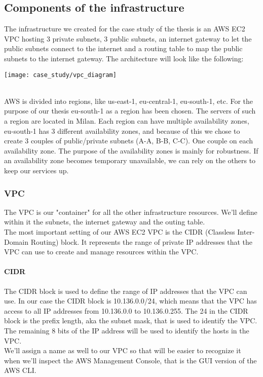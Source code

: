 \subsection{Components of the infrastructure}
The infrastructure we created for the case study of the thesis is an AWS EC2 \gls{VPC} hosting 3 private \gls{subnet}s, 3 public subnets, an \gls{internet gateway} to let the public subnets connect to the internet and a \gls{routing table} to map the public subnets to the internet gateway.
The architecture will look like the following:
\begin{center}
  \texttt{[image: case\_study/vpc\_diagram]} 
\end{center}\mbox{}\\
AWS is divided into regions, like us-east-1, eu-central-1, eu-south-1, etc.
For the purpose of our thesis eu-south-1 as a region has been chosen.
The servers of such a region are located in Milan.
Each region can have multiple availability zones, eu-south-1 has 3 different availability zones, and because of this we chose to create 3 couples of public/private subnets (A-A, B-B, C-C).
One couple on each availability zone.
The purpose of the availability zones is mainly for robustness.
If an availability zone becomes temporary unavailable, we can rely on the others to keep our services up.


\subsubsection{VPC}
The VPC is our "container" for all the other infrastructure resources.
We'll define within it the subnets, the internet gateway and the outing table.\\
The most important setting of our AWS EC2 VPC is the CIDR (Classless Inter-Domain Routing) block.
It represents the range of private IP addresses that the VPC can use to create and manage resources within the VPC.
\paragraph{CIDR}
The CIDR block is used to define the range of IP addresses that the VPC can use.
In our case the CIDR block is 10.136.0.0/24, which means that the VPC has access to all IP addresses from 10.136.0.0 to 10.136.0.255.
The 24 in the CIDR block is the prefix length, aka the subnet mask, that is used to identify the VPC.
The remaining 8 bits of the IP address will be used to identify the hosts in the VPC.\\
We'll assign a name as well to our VPC so that will be easier to recognize it when we'll inspect the AWS Management Console, that is the GUI version of the AWS CLI.

